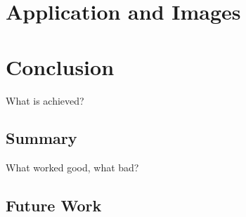 \documentclass[a4paper, 12pt]{scrartcl}
\begin{document}
\newpage
\section{Application and Images }


\newpage
\section{Conclusion}
What is achieved?
\subsection{Summary}
What worked good, what bad?

\subsection{Future Work}

\newpage
\appendix
\end{document}

